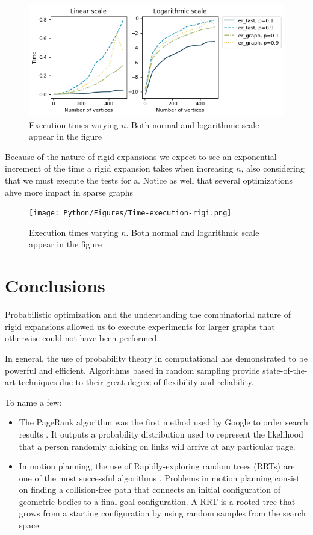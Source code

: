 \begin{figure}[h!]
	\centering
	\includegraphics[scale=0.7]{Python/Figures/Time-execution-er-generation-algoriths.png}
	\caption{Execution times varying $n$. Both normal and logarithmic scale appear in the figure}
	\label{fig:tiemposER}
\end{figure}

Because of the nature of rigid expansions we expect to see an exponential increment of the time a rigid expansion takes when increasing $n$, also considering that we must execute the tests for a. Notice as well that several optimizations ahve more impact in sparse graphs 

\begin{figure}[h!]
	\centering
	\texttt{[image: Python/Figures/Time-execution-rigi.png]}
	\caption{Execution times varying $n$. Both normal and logarithmic scale appear in the figure}
	\label{fig:tiemposER}
\end{figure}




\section{Conclusions}

Probabilistic optimization and the understanding the combinatorial nature of rigid expansions allowed us to execute experiments for larger graphs that otherwise could not have been performed.

In general, the use of probability theory in computational has demonstrated to be powerful and efficient. Algorithms based in random sampling provide state-of-the-art techniques due to their great degree of flexibility and reliability. 

To name a few:
\begin{itemize}
\item The PageRank algorithm was the first method used by Google to order search results \cite[Page 99]{pageRank}. It outputs a probability distribution used to represent the likelihood that a person randomly clicking on links will arrive at any particular page.
\item In motion planning, the use of Rapidly-exploring random trees (RRTs) are one of the most successful algorithms \cite[Alcazar 15]{Alcazar15}. Problems in motion planning consist on finding a collision-free path that connects an initial configuration of geometric bodies to a final goal configuration. A RRT is a rooted tree that grows from a starting configuration by using random samples from the search space.
\end{itemize}

